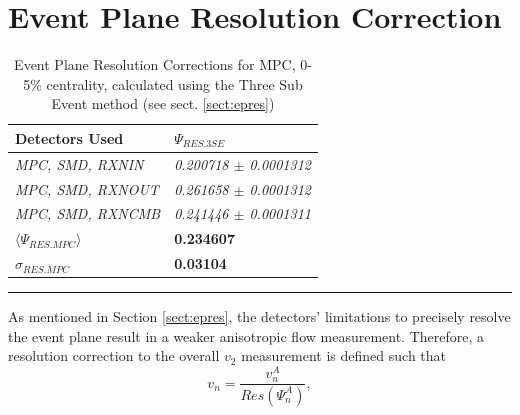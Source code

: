 \section{Event Plane Resolution Correction}
\label{secteperr}
\begin{table}[htbp!]
\centering
\label{EPrestable}
\begin{tabular}{|l|l|}
\hline
\textbf{Detectors Used}     & \textbf{$\Psi_{RES.3SE}$}       \\ \hline
\textit{MPC, SMD, RXNIN}    & \textit{0.200718 $\pm$ 0.0001312} \\ \hline
\textit{MPC, SMD, RXNOUT}   & \textit{0.261658 $\pm$ 0.0001312} \\ \hline
\textit{MPC, SMD, RXNCMB}   & \textit{0.241446 $\pm$ 0.0001311} \\ \hline
\textbf{$\langle\Psi_{RES.MPC}\rangle$}            & \textbf{0.234607}               \\ \hline
\textbf{$\sigma_{RES.MPC}$} & \textbf{0.03104}                \\ \hline
\end{tabular}
\rule{35em}{0.5pt}
\caption[Event Plane Resolution Corrections for MPC, 0-5\% centrality]{Event Plane Resolution Corrections for MPC, 0-5\% centrality, calculated using the Three Sub Event method (see sect. \ref{sect:epres})}
\end{table}
As mentioned in Section \ref{sect:epres}, the detectors' limitations to precisely resolve the event plane result in a weaker anisotropic flow measurement. Therefore, a resolution correction to the overall $v_2$ measurement is defined such that
\begin{equation}
v_n = \frac{v_n^{A}}{Res(\Psi_n^A)},
\end{equation}
